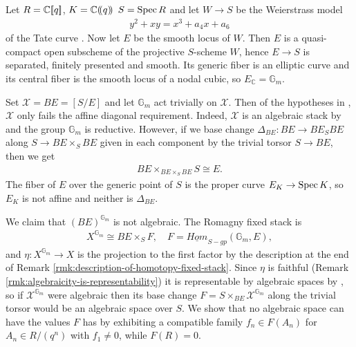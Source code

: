 \begin{example}\label{rl-000I}\label{example:affine-diagonal-is-necessary}
  Let \(R = \mathbb C[\hspace{-2pt}[q]\hspace{-2pt}]\), $K = \mathbb C(\hspace{-2pt}(q)\hspace{-2pt})$ \(S = \operatorname{Spec} R\) and let \(W \to S\) be the Weierstrass model
  \begin{align*}
    y^2 + xy = x^3 + a_4x + a_6
  \end{align*}
  of the Tate curve \cite{silverman_AdvancedTopicsArithmetic1999}. Now let \(E\) be the smooth locus of \(W\). Then \(E\) is a quasi-compact open subscheme of the projective \(S\)-scheme \(W\), hence \(E\to S\) is separated, finitely presented and smooth. Its generic fiber is an elliptic curve and its central fiber is the smooth locus of a nodal cubic, so \(E_{\mathbb C} = \mathbb G_m\).

  Set \(\mathcal X = BE = [S/E]\) and let \(\mathbb G_m\) act trivially on \(\mathcal X\). Then of the hypotheses in \cite[Theorem 1.2.1]{romagny_AlgebraicitySmoothnessFixed2022}, \(\mathcal X\) only fails the affine diagonal requirement. Indeed, \(\mathcal X\) is an algebraic stack by \cite[06PL]{stacks-project} and the group \(\mathbb G_m\) is reductive. However, if we base change \(\Delta_{BE}:BE\to BE_SBE\) along \(S\to BE\times_SBE\) given in each component by the trivial torsor \(S\to BE\), then we get
  \begin{align*}
    BE\times_{BE\times_SBE} S \cong E.
  \end{align*}
  The fiber of $E$ over the generic point of \(S\) is the proper curve \(E_K\to \operatorname{Spec} K\), so \(E_K\) is not affine and neither is \(\Delta_{BE}\).
  
  We claim that \((BE)^{\mathbb G_m}\) is not algebraic. The Romagny fixed stack is
  \begin{align*}
    X^{\mathbb G_m} \cong BE\times_S F, \hspace{1em} F = \underline{Hom}_{S-gp}(\mathbb G_m, E),
  \end{align*}
  and \(\eta:X^{\mathbb G_m}\to X\) is the projection to the first factor by the description at the end of Remark \ref{rmk:description-of-homotopy-fixed-stack}. Since \(\eta\) is faithful (Remark \ref{rmk:algebraicity-is-representability}) it is representable by algebraic spaces by \cite[\href{https://stacks.math.columbia.edu/tag/04Y5}{Tag 04Y5}]{stacks-project}, so if \(\mathcal X^{\mathbb G_m}\) were algebraic then its base change \(F = S\times_{BE}\mathcal X^{\mathbb G_m}\) along the trivial torsor would be an algebraic space over \(S\). We show that no algebraic space can have the values \(F\) has by exhibiting a compatible family \(f_n \in F(A_n)\) for \(A_n \in R/(q^n)\) with \(f_1 \neq 0\), while \(F(R) = 0\).
  

\end{example}
